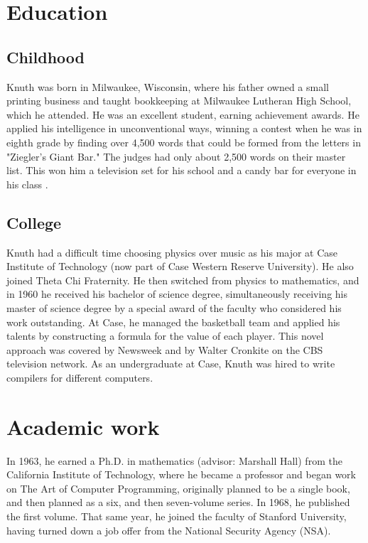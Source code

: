 \documentclass[a4paper,11pt]{article}
\begin{document}
\section{Education} 

\subsection{Childhood}
Knuth was born in Milwaukee, Wisconsin, where his father owned a small 
printing business and taught bookkeeping at Milwaukee Lutheran High 
School, which he attended. He was an excellent student, earning achievement 
awards. He applied his intelligence in unconventional ways, winning a contest 
when he was in eighth grade by finding over 4,500 words that could be formed 
from the letters in "Ziegler's Giant Bar." The judges had only about 
2,500 words on their master list. This won him a television set for his school 
and a candy bar for everyone in his class \cite{concurso}.

\subsection{College}
Knuth had a difficult time choosing physics over music as his major at Case 
Institute of Technology (now part of Case Western Reserve University). He 
also joined Theta Chi Fraternity. He then switched from physics to mathematics, 
and in 1960 he received his bachelor of science degree, simultaneously 
receiving his master of science degree by a special award of the faculty 
who considered his work outstanding. At Case, he managed the basketball 
team and applied his talents by constructing a formula for the value of 
each player. This novel approach was covered by Newsweek and by Walter 
Cronkite on the CBS television network. As an undergraduate at Case, 
Knuth was hired to write compilers for different computers.

\section{Academic work}

In 1963, he earned a Ph.D. in mathematics (advisor: Marshall Hall) from 
the California Institute of Technology, where he became a professor and 
began work on The Art of Computer Programming, originally planned to be 
a single book, and then planned as a six, and then seven-volume series. 
In 1968, he published the first volume. That same year, he joined the 
faculty of Stanford University, having turned down a job offer from 
the National Security Agency (NSA).
\end{document}
